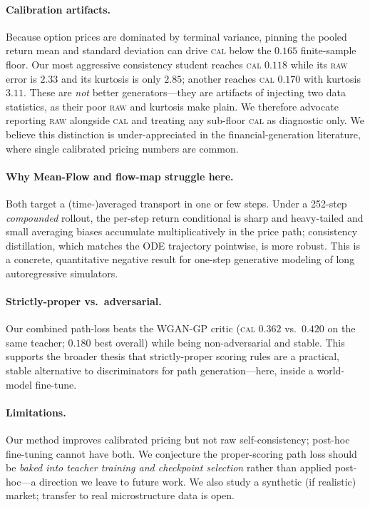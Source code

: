 \documentclass[11pt]{article}
\newcommand{\raw}{\textsc{raw}}
\renewcommand{\cal}{\textsc{cal}}
\begin{document}
\paragraph{Calibration artifacts.}
Because option prices are dominated by terminal variance, pinning the pooled
return mean and standard deviation can drive \cal{} below the $0.165$ finite-sample
floor. Our most aggressive consistency student reaches \cal{} $0.118$ while its
\raw{} error is $2.33$ and its kurtosis is only $2.85$; another reaches
\cal{} $0.170$ with kurtosis $3.11$. These are \emph{not} better
generators---they are artifacts of injecting two data statistics, as their poor
\raw{} and kurtosis make plain. We therefore advocate reporting \raw{} alongside
\cal{} and treating any sub-floor \cal{} as diagnostic only. We believe this
distinction is under-appreciated in the financial-generation literature, where
single calibrated pricing numbers are common.

\paragraph{Why Mean-Flow and flow-map struggle here.}
Both target a (time-)averaged transport in one or few steps. Under a 252-step
\emph{compounded} rollout, the per-step return conditional is sharp and
heavy-tailed and small averaging biases accumulate multiplicatively in the price
path; consistency distillation, which matches the ODE trajectory pointwise, is more
robust. This is a concrete, quantitative negative result for one-step generative
modeling of long autoregressive simulators.

\paragraph{Strictly-proper vs.\ adversarial.}
Our combined path-loss beats the WGAN-GP critic (\cal{} $0.362$ vs.\ $0.420$ on the
same teacher; $0.180$ best overall) while being non-adversarial and stable. This
supports the broader thesis \citep{issa2023nonadversarial,pacchiardi2024probabilistic}
that strictly-proper scoring rules are a practical, stable alternative to
discriminators for path generation---here, inside a world-model fine-tune.

\paragraph{Limitations.}
Our method improves calibrated pricing but not raw self-consistency; post-hoc
fine-tuning cannot have both. We conjecture the proper-scoring path loss should be
\emph{baked into teacher training and checkpoint selection} rather than applied
post-hoc---a direction we leave to future work. We also study a synthetic (if
realistic) market; transfer to real microstructure data is open.
\end{document}
